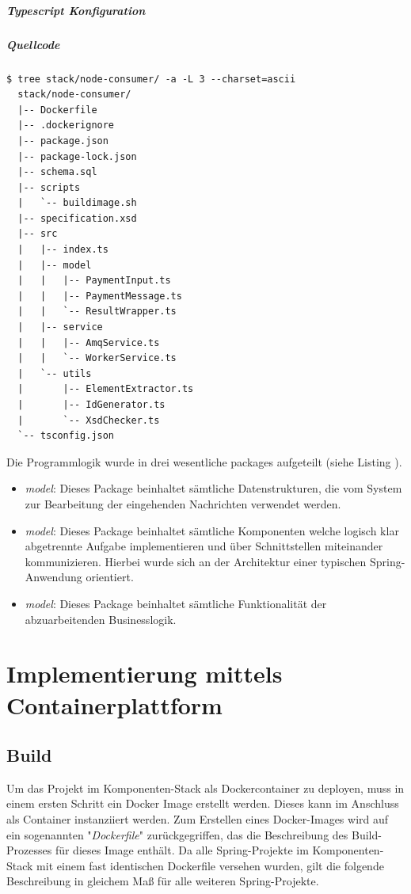 \subparagraph{Typescript Konfiguration}

\subparagraph{Quellcode}


\begin{minipage}{\linewidth}
\begin{lstlisting}[style=bashStyle,caption={Node.js Projektstruktur},label=lst:nodeProjStruc]
  $ tree stack/node-consumer/ -a -L 3 --charset=ascii
  stack/node-consumer/
  |-- Dockerfile
  |-- .dockerignore
  |-- package.json
  |-- package-lock.json
  |-- schema.sql
  |-- scripts
  |   `-- buildimage.sh
  |-- specification.xsd
  |-- src
  |   |-- index.ts
  |   |-- model
  |   |   |-- PaymentInput.ts
  |   |   |-- PaymentMessage.ts
  |   |   `-- ResultWrapper.ts
  |   |-- service
  |   |   |-- AmqService.ts
  |   |   `-- WorkerService.ts
  |   `-- utils
  |       |-- ElementExtractor.ts
  |       |-- IdGenerator.ts
  |       `-- XsdChecker.ts
  `-- tsconfig.json
\end{lstlisting}
\end{minipage}


Die Programmlogik wurde in drei wesentliche packages aufgeteilt (siehe Listing ). 

\begin{itemize}
  \item \emph{model}: Dieses Package beinhaltet sämtliche Datenstrukturen, die vom System zur Bearbeitung der eingehenden Nachrichten verwendet werden.
  \item \emph{model}: Dieses Package beinhaltet sämtliche Komponenten welche logisch klar abgetrennte Aufgabe implementieren und über Schnittstellen miteinander kommunizieren. Hierbei wurde sich an der Architektur einer typischen Spring-Anwendung orientiert.
  \item \emph{model}: Dieses Package beinhaltet sämtliche Funktionalität der abzuarbeitenden Businesslogik.
\end{itemize}





\section{Implementierung mittels Containerplattform}


\subsection{Build}
Um das Projekt im Komponenten-Stack als Dockercontainer zu deployen, muss in einem ersten Schritt ein Docker Image erstellt werden. Dieses kann im Anschluss als Container instanziiert werden. Zum Erstellen eines Docker-Images wird auf ein sogenannten "\emph{Dockerfile}" zurückgegriffen, das die Beschreibung des Build-Prozesses für dieses Image enthält. Da alle Spring-Projekte im Komponenten-Stack mit einem fast identischen Dockerfile versehen wurden, gilt die folgende Beschreibung in gleichem Maß für alle weiteren Spring-Projekte. 

